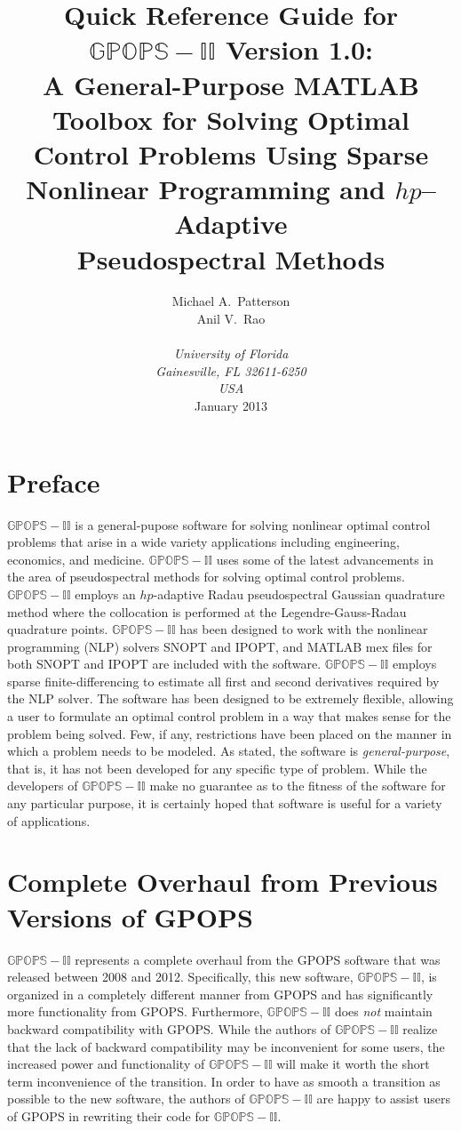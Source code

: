\documentclass[10pt]{article}
\title{{\bf Quick Reference Guide for $\mathbb{GPOPS-II}$ Version 1.0:} \vspace{12pt}\\
  {\bf A General-Purpose MATLAB Toolbox for Solving Optimal Control Problems
    Using Sparse Nonlinear Programming and $hp$--Adaptive \\ Pseudospectral Methods}}
\author{Michael A.~Patterson \\ Anil V.~Rao \\\\ {\em University of
    Florida} \\ {\em Gainesville, FL 32611-6250} \\ {\em USA}
  \vspace{24pt} \\ January 2013}
\date{}
\begin{document}
\setcounter{tocdepth}{1}



\maketitle
\clearpage


\section*{Preface}

$\mathbb{GPOPS-II}$ is a general-pupose software for solving nonlinear
optimal control problems that arise in a wide variety applications
including engineering, economics, and medicine.  $\mathbb{GPOPS-II}$ uses
some of the latest advancements in the area of pseudospectral methods
for solving optimal control problems.  $\mathbb{GPOPS-II}$ employs an 
$hp$-adaptive Radau pseudospectral Gaussian quadrature method where
the collocation is performed at the Legendre-Gauss-Radau quadrature
points.  $\mathbb{GPOPS-II}$ has been designed to work with the nonlinear
programming (NLP) solvers SNOPT and IPOPT, and MATLAB mex files for
both SNOPT and IPOPT are included with the software.  $\mathbb{GPOPS-II}$
employs sparse finite-differencing to estimate all first and second
derivatives required by the NLP solver.  The software has been
designed to be extremely flexible, allowing a user to formulate an
optimal control problem in a way that makes sense for the problem
being solved.  Few, if any, restrictions have been placed on the
manner in which a problem needs to be modeled.  As stated, the
software is {\em general-purpose}, that is, it has not been developed
for any specific type of problem.  While the developers of
$\mathbb{GPOPS-II}$ make no guarantee as to the fitness of the software for
any particular purpose, it is certainly hoped that software is useful
for a variety of applications.

\section*{Complete Overhaul from Previous Versions of GPOPS}

$\mathbb{GPOPS-II}$ represents a complete overhaul from the GPOPS software that was
released between 2008 and 2012.  Specifically, this new software,
$\mathbb{GPOPS-II}$, is organized in a completely different manner from GPOPS and
has significantly more functionality from GPOPS.  Furthermore, $\mathbb{GPOPS-II}$
does {\em not} maintain backward compatibility with GPOPS.  While the
authors of $\mathbb{GPOPS-II}$ realize that the lack of backward compatibility may
be inconvenient for some users, the increased power and functionality
of $\mathbb{GPOPS-II}$ will make it worth the short term inconvenience of the
transition.  In order to have as smooth a transition as possible to
the new software, the authors of $\mathbb{GPOPS-II}$ are happy to assist users of
GPOPS in rewriting their code for $\mathbb{GPOPS-II}$.  
\end{document}
